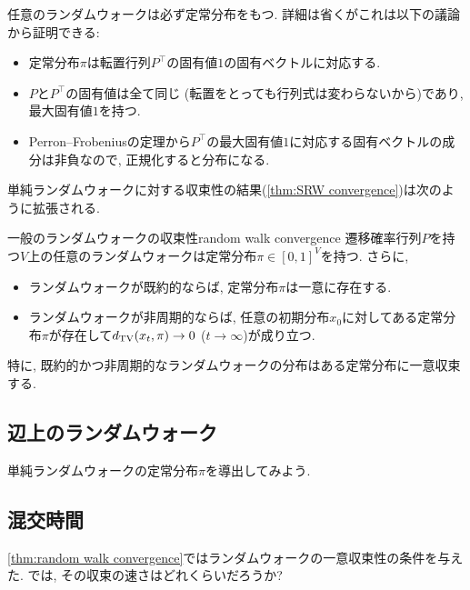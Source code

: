   任意のランダムウォークは必ず定常分布をもつ.
  詳細は省くがこれは以下の議論から証明できる:
    \begin{itemize}
    \item 定常分布$\pi$は転置行列$P^{\top}$の固有値$1$の固有ベクトルに対応する.
    \item $P$と$P^\top$の固有値は全て同じ (転置をとっても行列式は変わらないから)であり, 最大固有値$1$を持つ.
    \item Perron--Frobeniusの定理から$P^\top$の最大固有値$1$に対応する固有ベクトルの成分は非負なので, 正規化すると分布になる.
    \end{itemize}
  単純ランダムウォークに対する収束性の結果(\cref{thm:SRW convergence})は次のように拡張される.
  \begin{theorem}{一般のランダムウォークの収束性}{random walk convergence}
      遷移確率行列$P$を持つ$V$上の任意のランダムウォークは定常分布$\pi \in [0,1]^V$を持つ.
      さらに,
      \begin{itemize}
      \item ランダムウォークが既約的ならば, 定常分布$\pi$は一意に存在する.
      \item ランダムウォークが非周期的ならば, 任意の初期分布$x_0$に対してある定常分布$\pi$が存在して$d_{\mathrm{TV}}(x_t,\pi)\to 0$ ($t\to\infty$)が成り立つ.
      \end{itemize}

      特に, 既約的かつ非周期的なランダムウォークの分布はある定常分布に一意収束する.
  \end{theorem}


\subsection{辺上のランダムウォーク}
単純ランダムウォークの定常分布$\pi$を導出してみよう.


\subsection{混交時間}
\cref{thm:random walk convergence}ではランダムウォークの一意収束性の条件を与えた.
では, その収束の速さはどれくらいだろうか?